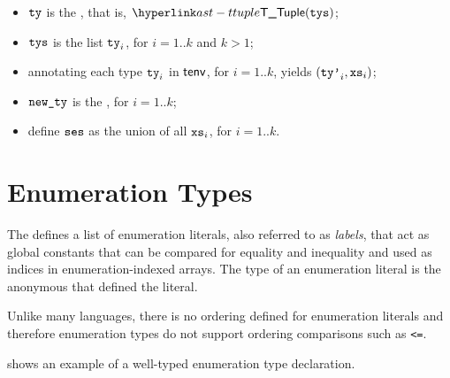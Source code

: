 \ProseParagraph
\AllApply
\begin{itemize}
  \item $\tty$ is the \Prosetupletype{$\tys$}, that is, $\TTuple(\tys)$;
  \item $\tys$ is the list $\tty_i$, for $i=1..k$ and $k>1$;
  \item annotating each type $\tty_i$ in $\tenv$, for $i=1..k$,
        yields $(\ttyp_i, \vxs_i)$\ProseOrTypeError;
  \item $\newty$ is the , for $i=1..k$;
  \item define $\vses$ as the union of all $\vxs_i$, for $i=1..k$.
\end{itemize}

\FormallyParagraph
\begin{mathpar}
\end{mathpar}

\section{Enumeration Types\label{sec:EnumerationTypes}}
\hypertarget{enumerationtypeterm}{}
The \emph{\enumerationtypeterm} defines a list of enumeration literals,
also referred to as \emph{labels}, that act
as global constants that can be compared for equality and inequality and used
as indices in enumeration-indexed arrays.
%
The type of an enumeration literal is the anonymous \enumerationtypeterm{}
that defined the literal.
 

%
Unlike many languages, there is no ordering defined for enumeration literals
and therefore enumeration types do not support ordering comparisons such as \verb|<=|.

 shows an example of a well-typed enumeration type declaration.

